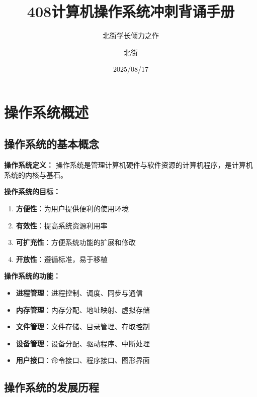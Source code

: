 \documentclass[lang=cn,newtx,10pt,scheme=chinese]{../../elegantbook}
\title{408计算机操作系统冲刺背诵手册}
\subtitle{北街学长倾力之作}
\author{北街}
\date{2025/08/17}
\begin{document}
\maketitle
\frontmatter

\tableofcontents

\mainmatter


\chapter{操作系统概述}

\section{操作系统的基本概念}

\textbf{操作系统定义：}
操作系统是管理计算机硬件与软件资源的计算机程序，是计算机系统的内核与基石。

\textbf{操作系统的目标：}
\begin{enumerate}
  \item \textbf{方便性}：为用户提供便利的使用环境
  \item \textbf{有效性}：提高系统资源利用率
  \item \textbf{可扩充性}：方便系统功能的扩展和修改
  \item \textbf{开放性}：遵循标准，易于移植
\end{enumerate}

\textbf{操作系统的功能：}
\begin{itemize}
  \item \textbf{进程管理}：进程控制、调度、同步与通信
  \item \textbf{内存管理}：内存分配、地址映射、虚拟存储
  \item \textbf{文件管理}：文件存储、目录管理、存取控制
  \item \textbf{设备管理}：设备分配、驱动程序、中断处理
  \item \textbf{用户接口}：命令接口、程序接口、图形界面
\end{itemize}

\section{操作系统的发展历程}
\end{document}
